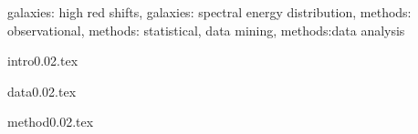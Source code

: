 \documentclass[useAMS,usenatbib]{mn2e}
\begin{document}
\begin{keywords} 
 galaxies: high red shifts, galaxies: spectral energy distribution, methods: observational, methods: statistical, data mining, methods:data analysis
\end{keywords}

{intro0.02.tex}

{data0.02.tex}


{method0.02.tex}
\end{document}
